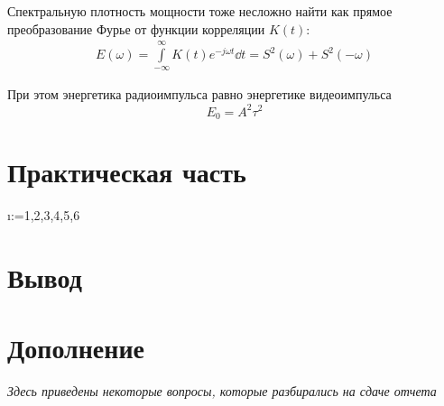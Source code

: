 Спектральную плотность мощности тоже несложно найти как прямое преобразование
Фурье от функции корреляции $K(t)$:
\begin{equation}
    \begin{gathered}
        E(\omega) = \int\limits_{-\infty}^{\infty} K(t) e^{-j\omega t} \dd t =
        S^2(\omega) + S^2(- \omega)
    \end{gathered}
\end{equation}


При этом энергетика радиоимпульса равно энергетике видеоимпульса
\begin{equation}
    \label{eq:}
    E_0 = A^2 \tau^2
\end{equation}


\newpage
\section{Практическая часть}

\makeatletter
\@for\i:={1,2,3,4,5,6}\do{ \newpage}
\makeatother


\section{Вывод}


\newpage
\section{Дополнение}
\textit{Здесь приведены некоторые вопросы, которые разбирались на сдаче отчета}


